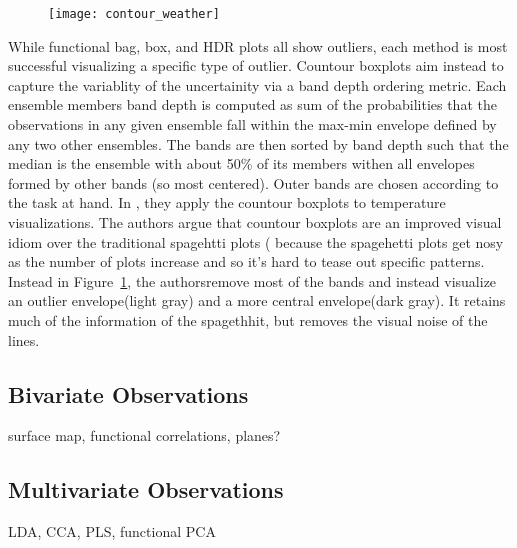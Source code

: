 \documentclass[../main.tex]{subfiles}
\begin{document}
\begin{figure}
  \texttt{[image: contour\_weather]}
  \caption{\label{fig:countour}}
\end{figure}
While functional bag, box, and HDR plots all show outliers, each method is most
successful visualizing a specific type of outlier. Countour
boxplots\cite{whitaker2013} aim instead to capture the variablity of the
uncertainity via a band depth ordering metric. Each ensemble members band depth
is computed as sum of the probabilities that the observations in any given
ensemble fall within the max-min envelope defined by any two other
ensembles. The bands are then sorted by band depth such that the median is the
ensemble with about 50\% of its members withen all envelopes formed by other
bands (so most centered). Outer bands are chosen according to the task at
hand. In \cite{whitaker2013}, they apply the countour boxplots to temperature
visualizations. The authors argue that countour boxplots are an improved visual
idiom over the traditional spagehtti plots (%
because the spagehetti plots get nosy as the number of plots increase
and so it's hard to tease out specific patterns. Instead in
Figure~\ref{fig:countour}, the authorsremove most of the bands and instead visualize an outlier envelope(light gray)
and a more central envelope(dark gray). It retains much of the information of
the spagethhit, but removes the visual noise of the lines.



\subsection{Bivariate Observations}

surface map, functional correlations, planes?

\subsection{Multivariate Observations}
LDA, CCA, 
PLS, functional PCA
\end{document}
